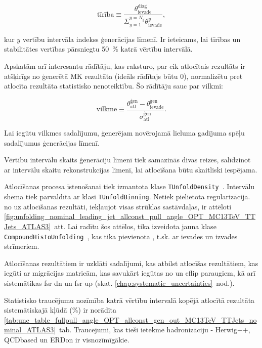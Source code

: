 \begin{equation}
  \text{tīrība}\equiv\frac{\theta^{\text{diag}}_{\text{ievade}}}{\Sigma_{y=1}^{y=N_{y}}\theta^{y}_{\text{ievade}}},
\end{equation}

kur $y$ vertību intervāla indekss ģenerācijas līmenī. Ir ieteicams, lai tīrības un stabilitātes vertības pārsniegtu 50~\% katrā vērtību intervālā.

Apskatām arī interesantu rādītāju, kas raksturo, par cik atlocītais rezultāts ir atšķirīgs no ģenerētā MK rezultāta (ideāls rādītajs būtu 0), normalizētu pret atlocīta rezultāta statistisko nenoteiktību. Šo rādītāju sauc par vilkmi:

\begin{equation}
  \text{vilkme}\equiv\frac{\theta^{\text{ģen}}_{\text{atl}}-\theta^{\text{ģen}}_{\text{ievade}}}{\sigma^{\text{ģen}}_{\text{atl}}}.
\end{equation}

Lai iegūtu vilkmes sadalījumu, ģenerējam novērojamā lieluma gadījuma spēļu sadalījumus ģenerācijas līmenī.

Vērtību intervālu skaits ģenerāciju līmenī tiek samazinās divas reizes, salīdzinot ar intervālu skaitu rekonstrukcijas līmenī, lai atlocīšana būtu skaitliski iespējama.

Atlocīšanas procesa īstenošanai tiek izmantota \ROOT klase \lstinline[language=sh]|TUnfoldDensity|~\cite{Schmitt:2012kp}. Intervālu shēma tiek pārvaldīta ar klasi \lstinline[language=sh]|TUnfoldBinning|. Netiek pielietota regularizācija. \pullangle no \leadingjet uz \scndleadingjet atlocīšanas rezultāti, iekļaujot visas strūklas sastāvdaļas, ir attēloti \ref{fig:unfolding_nominal_leading_jet_allconst_pull_angle_OPT_MC13TeV_TTJets_ATLAS3}~att. Lai radītu šos attēlos, tika izveidota jauna klase \lstinline[language=sh]|CompoundHistoUnfolding|~\cite{url:compoundhistounfolding}, kas tika pievienota \ROOT, t.sk. ar ievades un izvades strīmeriem.

Atlocīšanas rezultātiem ir uzklāti sadalījumi, kas atbilst atlocīšas rezultātiem, kas iegūti ar migrācijas matricām, kas savukārt iegūtas no \ttbar \HERWIGpp un \ttbar cflip paraugiem, kā arī sistemātikas \ttbar fsr dn un \ttbar fsr up (skat. \ref{chap:systematic_uncertainties}~nod.).

Statistisko \gls{traucējumu} nozīmība katrā vērtību intervalā kopējā atlocītā rezultāta sistemātiskajā kļūdā  (\%) ir norādīta \ref{tab:unc_table_fullpull_angle_OPT_allconst_gen_out_MC13TeV_TTJets_nominal_ATLAS3}~tab. Traucējumi, kas tieši ietekmē hadronizāciju - \ttbar Herwig++, \ttbar QCDbased un \ttbar ERDon ir visnozīmīgākie.

